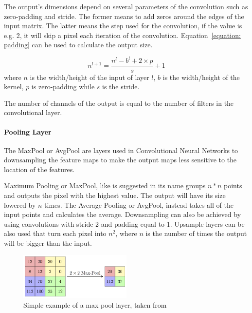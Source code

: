 The output's dimensions depend on several parameters of the convolution such as
zero-padding and stride. The former means to add zeros around the edges of the
input matrix. The latter means the step used for the convolution, if the value
is e.g. 2, it will skip a pixel each iteration of the convolution.
Equation~\ref{equation: padding} can be used to calculate the output size.

\begin{equation} \label{equation:padding}
     n^{l+1} = \frac{n^{l}- b^{l}+2 \times p}{s} + 1
\end{equation}
where $n$ is the width/height of the input of layer $l$, $ b$ is the
width/height of the kernel, $p$ is zero-padding while $s$ is the stride.

The number of channels of the output is equal to the number of filters in the
convolutional layer.


\paragraph{Pooling Layer}

The MaxPool or AvgPool are layers used in Convolutional Neural Networks to
downsampling the feature maps to make the output maps less sensitive to the
location of the features.

Maximum Pooling or MaxPool, like is suggested in its name groups $ n * n $
points and outputs the pixel with the highest value.  The output will have its size
lowered by $n$ times.  The Average Pooling or AvgPool, instead takes all of
the input points and calculates the average. Downsampling can also be achieved
by using convolutions with stride 2 and padding equal to 1.  Upsample layers can
be also used that turn each pixel into $n^{2}$, where $n$ is the number of times
the output will be bigger than the input.

\begin{figure}[!htbp]
    \centering
    \includegraphics[width=0.5\textwidth]{Figures/maxpool.png}
    \caption{Simple example of a max pool layer, taken from~\cite{maxpoolimg}}
    \label{figure:maxpool}
\end{figure} 
 

